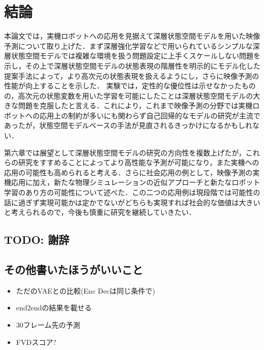 \chapter{結論}
\label{chap:conclusion}

本論文では，実機ロボットへの応用を見据えて深層状態空間モデルを用いた映像予測について取り上げた．まず深層強化学習などで用いられているシンプルな深層状態空間モデルでは複雑な環境を扱う問題設定に上手くスケールしない問題を示し，その上で深層状態空間モデルの状態表現の階層性を明示的にモデル化した提案手法によって，より高次元の状態表現を扱えるようにし，さらに映像予測の性能が向上することを示した．
実験では，定性的な優位性は示せなかったものの，高次元の状態変数を用いた学習を可能にしたことは深層状態空間モデルの大きな問題を克服したと言える．これにより，これまで映像予測の分野では実機ロボットへの応用上の制約が多いにも関わらず自己回帰的なモデルの研究が主流であったが，状態空間モデルベースの手法が見直されるきっかけになるかもしれない．

第六章では展望として深層状態空間モデルの研究の方向性を複数上げたが，これらの研究をすすめることによってより高性能な予測が可能になり，また実機への応用の可能性も高められると考える．さらに社会応用の例として，映像予測の実機応用に加え，新たな物理シミュレーションの近似アプローチと新たなロボット学習のあり方の可能性について述べた．この二つの応用例は現段階では可能性の話に過ぎず実現可能かは定かでないがどちらも実現すれば社会的な価値は大きいと考えられるので，今後も慎重に研究を継続していきたい．

\newpage
\section{TODO: 謝辞}

\section{その他書いたほうがいいこと}
\begin{itemize}
    \item ただのVAEとの比較(Enc Decは同じ条件で)
    \item end2endの結果を載せる
    \item 30フレーム先の予測
    \item FVDスコア?
\end{itemize}
